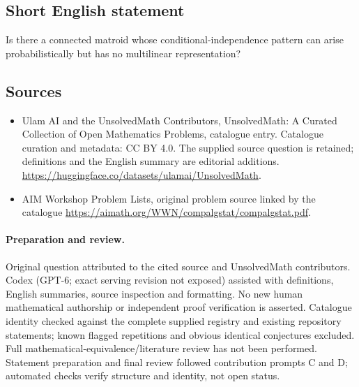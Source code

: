 \documentclass[11pt]{article}
\begin{document}
\subsection{Short English statement}
Is there a connected matroid whose conditional-independence pattern can arise probabilistically but has no multilinear representation?
\subsection{Sources}
\begin{itemize}
\item[\hypertarget{source:statement:1}{S1}] Ulam AI and the UnsolvedMath Contributors, UnsolvedMath: A Curated Collection of Open Mathematics Problems, catalogue entry. Catalogue curation and metadata: CC BY 4.0. The supplied source question is retained; definitions and the English summary are editorial additions.
\url{https://huggingface.co/datasets/ulamai/UnsolvedMath}.
\item[\hypertarget{source:statement:2}{S2}] AIM Workshop Problem Lists, original problem source linked by the catalogue
\url{https://aimath.org/WWN/compalgstat/compalgstat.pdf}.
\end{itemize}
\paragraph{Preparation and review.}
Original question attributed to the cited source and UnsolvedMath contributors. Codex (GPT-6; exact serving revision not exposed) assisted with definitions, English summaries, source inspection and formatting. No new human mathematical authorship or independent proof verification is asserted. Catalogue identity checked against the complete supplied registry and existing repository statements; known flagged repetitions and obvious identical conjectures excluded. Full mathematical-equivalence/literature review has not been performed. Statement preparation and final review followed contribution prompts C and D; automated checks verify structure and identity, not open status.
\label{end:statement}
\end{document}

